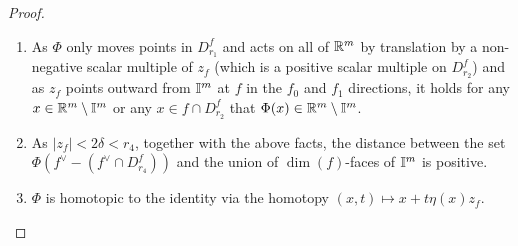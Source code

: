 \begin{proof}
\begin{enumerate}
		\item\label{I: pushout} As $\Phi$ only moves points in $D_{r_1}^f$ and acts on all of $\mathbb{R}^m$ by translation by a non-negative scalar multiple of $z_f$ (which is a positive scalar multiple on $D_{r_2}^f$) and as $z_f$ points outward from $\mathbb{I}^m$ at $f$ in the $f_0$ and $f_1$ directions, it holds for any $x \in \mathbb{R}^m \setminus \mathbb{I}^m$ or any $x \in f \cap D_{r_2}^f$ that $\Phi(x) \in \mathbb{R}^m \setminus \mathbb{I}^m$.

		\item As $|z_f| < 2\delta < r_4$, together with the above facts, the distance between the set $\Phi(f^\vee-(f^\vee \cap D_{r_4}^f))$ and the union of $\dim(f)$-faces of $\mathbb{I}^m$ is positive.

		\item\label{I: Phi homotopy} $\Phi$ is homotopic to the identity via the homotopy $(x,t) \mapsto x+ t \eta(x) z_f$.
	\end{enumerate}


\end{proof}
